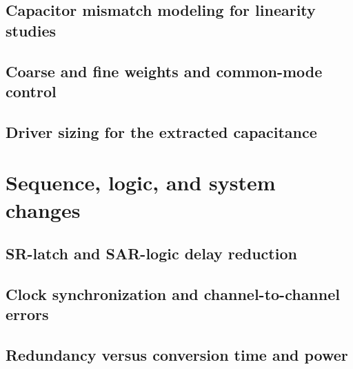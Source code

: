 \documentclass[PhD, UKenglish]{scrbook}
\begin{document}
\subsection{Capacitor mismatch modeling for linearity studies}
\subsection{Coarse and fine weights and common-mode control}
\subsection{Driver sizing for the extracted capacitance}

\section{Sequence, logic, and system changes}
\subsection{SR-latch and SAR-logic delay reduction}
\subsection{Clock synchronization and channel-to-channel errors}
\subsection{Redundancy versus conversion time and power}
\end{document}

